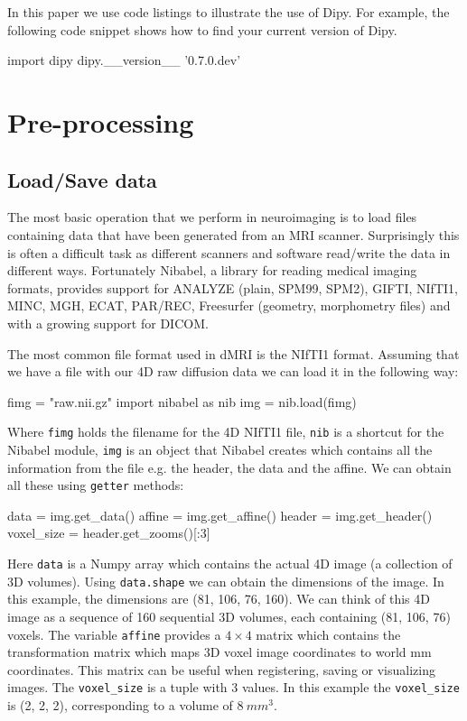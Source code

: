 \documentclass{bioinfo}
\begin{document}
In this paper we use code listings to illustrate the use of Dipy. For
example, the following code snippet shows how to find your current version of
Dipy.
\begin{python}
import dipy
dipy.__version__
'0.7.0.dev'
\end{python}

\section{Pre-processing}\label{preprocessing}

\subsection{Load/Save data}\label{loadsave}
The most basic operation that we perform in neuroimaging is to load files
containing data that have been generated from an MRI scanner. Surprisingly this
is often a difficult task as different scanners and software read/write the data
in different ways.  Fortunately Nibabel, a library for reading medical imaging
formats, provides support for ANALYZE (plain, SPM99, SPM2), GIFTI, NIfTI1, MINC,
MGH, ECAT, PAR/REC, Freesurfer (geometry, morphometry files) and with a growing
support for DICOM.

The most common file format used in dMRI is the NIfTI1 format. Assuming that we have a
file with our 4D raw diffusion data we can load it in the following way:
\begin{python}
fimg = "raw.nii.gz"
import nibabel as nib
img = nib.load(fimg)
\end{python}
Where \texttt{fimg} holds the filename for the 4D NIfTI1 file, \texttt{nib} is
a shortcut for the Nibabel module, \texttt{img} is an object that Nibabel
creates which contains all the information from the file e.g. the header, the
data and the affine. We can obtain all these using \texttt{getter} methods:
\begin{python}
data = img.get_data()
affine = img.get_affine()
header = img.get_header()
voxel_size = header.get_zooms()[:3]
\end{python}
Here \texttt{data} is a Numpy array which contains the actual 4D image (a
collection of 3D volumes). Using \texttt{data.shape} we can obtain the
dimensions of the image. In this example, the dimensions are (81, 106, 76,
160).  We can think of this 4D image as a sequence of 160 sequential 3D volumes,
each containing (81, 106, 76) voxels.  The variable \texttt{affine} provides a
$4\times4$ matrix which contains the transformation matrix which maps 3D voxel
image coordinates to world mm coordinates. This matrix can be useful when
registering, saving or visualizing images. The \texttt{voxel\_size} is a tuple
with 3 values. In this example the \texttt{voxel\_size} is (2, 2, 2),
corresponding to a volume of $8~mm^3$.
\end{document}
